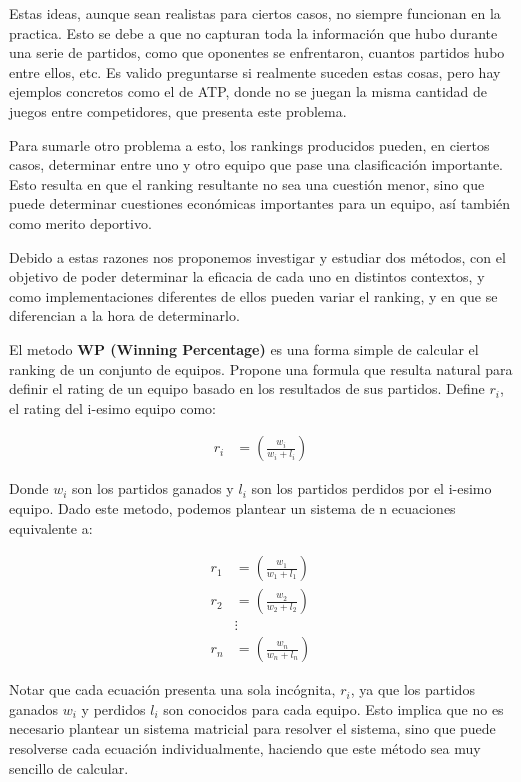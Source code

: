 \documentclass[a4paper]{article}
\begin{document}
Estas ideas, aunque sean realistas para ciertos casos, no siempre funcionan en la practica. Esto se debe a que no capturan toda la información que hubo durante una serie de partidos, como que oponentes se enfrentaron, cuantos partidos hubo entre ellos, etc. Es valido preguntarse si realmente suceden estas cosas, pero hay ejemplos concretos como el de ATP, donde no se juegan la misma cantidad de juegos entre competidores, que presenta este problema.

Para sumarle otro problema a esto, los rankings producidos pueden, en ciertos casos, determinar entre uno y otro equipo que pase una clasificación importante. Esto resulta en que el ranking resultante no sea una cuestión menor, sino que puede determinar cuestiones económicas importantes para un equipo, así también como merito deportivo.

Debido a estas razones nos proponemos investigar y estudiar dos métodos, con el objetivo de poder determinar la eficacia de cada uno en distintos contextos, y como implementaciones diferentes de ellos pueden variar el ranking, y en que se diferencian a la hora de determinarlo.

El metodo \textbf{WP (Winning Percentage)} es una forma simple de calcular el ranking de un conjunto de equipos. Propone una formula que resulta natural para definir el rating de un equipo basado en los resultados de sus partidos. Define $r_{i}$, el rating del i-esimo equipo como:

\begin{align*}
    r_{i} &= (\frac{w_{i}}{w_{i}+l_{i}})
\end{align*}

Donde $w_{i}$ son los partidos ganados y $l_{i}$ son los partidos perdidos por el i-esimo equipo.
Dado este metodo, podemos plantear un sistema de n ecuaciones equivalente a:

\begin{align*}
    r_{1} &= (\frac{w_{1}}{w_{1}+l_{1}})\\
    r_{2} &= (\frac{w_{2}}{w_{2}+l_{2}})\\
    & \vdots \\
    r_{n} &= (\frac{w_{n}}{w_{n}+l_{n}})
\end{align*}

Notar que cada ecuación presenta una sola incógnita, $r_{i}$, ya que los partidos ganados $w_{i}$ y perdidos $l_{i}$ son conocidos para cada equipo. Esto implica que no es necesario plantear un sistema matricial para resolver el sistema, sino que puede resolverse cada ecuación individualmente, haciendo que este método sea muy sencillo de calcular.
\end{document}
